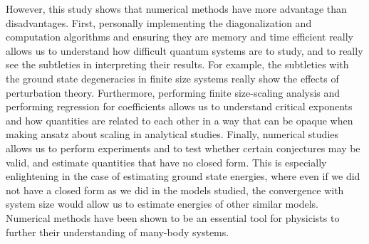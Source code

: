 \documentclass[12pt]{article}{}
\begin{document}
However, this study shows that numerical methods have more advantage than disadvantages. First, personally implementing the diagonalization and computation algorithms and ensuring they are memory and time efficient really allows us to understand how difficult quantum systems are to study, and to really see the subtleties in interpreting their results. For example, the subtleties with the ground state degeneracies in finite size systems really show the effects of perturbation theory. Furthermore, performing finite size-scaling analysis and performing regression for coefficients allows us to understand critical exponents and how quantities are related to each other in a way that can be opaque when making ansatz about scaling in analytical studies. Finally, numerical studies allows us to perform experiments and to test whether certain conjectures may be valid, and estimate quantities that have no closed form. This is especially enlightening in the case of estimating ground state energies, where even if we did not have a closed form as we did in the models studied, the convergence with system size would allow us to estimate energies of other similar models. Numerical methods have been shown to be an essential tool for physicists to further their understanding of many-body systems.



\pagestyle{bibliography}


\end{document}
